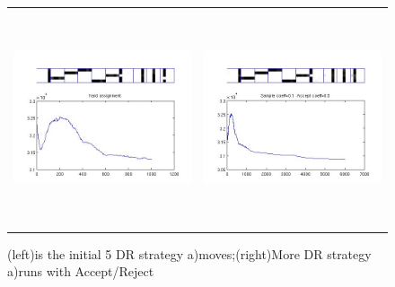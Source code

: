 \documentclass{article}
\begin{document}
\begin{spacing}{1.1}
\begin{figure}
 \centering
   \begin{tabular}{cc}    
     \includegraphics[width=3in,height=2.5in]{200_hard.jpg} &
     \includegraphics[width=3in,height=2.5in]{200_hard_stuck.jpg} \\
   \end{tabular}
    \caption{(left)is the initial 5 DR strategy a)moves;(right)More DR strategy a)runs with Accept/Reject}
    \label{fig:by:table} 
\end{figure}


\end{spacing}
\end{document}
